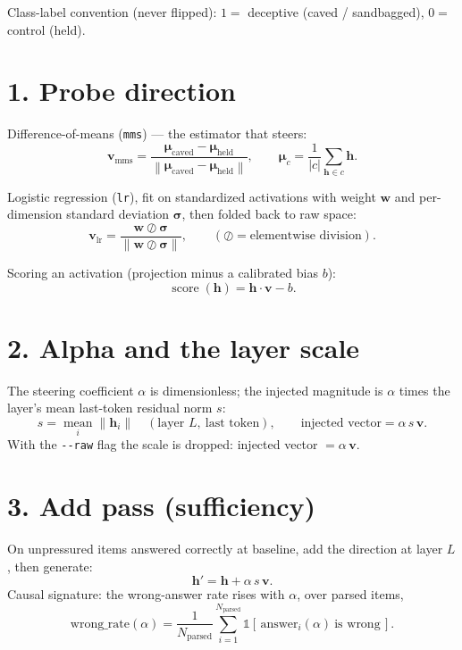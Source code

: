\documentclass[11pt]{article}
\newcommand{\vv}{\bm{v}}
\newcommand{\hh}{\bm{h}}
\newcommand{\muvec}{\bm{\mu}}
\newcommand{\norm}[1]{\left\lVert #1 \right\rVert}
\newcommand{\ind}{\mathbb{1}}
\begin{document}
\bigskip
\noindent
Class-label convention (never flipped): $1=$ deceptive (caved / sandbagged),
$0=$ control (held).

\section*{1. Probe direction}

Difference-of-means (\texttt{mms}) --- the estimator that steers:
\begin{equation}
  \vv_{\text{mms}}
  = \frac{\muvec_{\text{caved}} - \muvec_{\text{held}}}
         {\norm{\muvec_{\text{caved}} - \muvec_{\text{held}}}},
  \qquad
  \muvec_{c} = \frac{1}{\lvert c \rvert}\sum_{\hh \in c} \hh .
\end{equation}

Logistic regression (\texttt{lr}), fit on standardized activations with weight
$\bm{w}$ and per-dimension standard deviation $\bm{\sigma}$, then folded back to
raw space:
\begin{equation}
  \vv_{\text{lr}}
  = \frac{\bm{w} \oslash \bm{\sigma}}{\norm{\bm{w} \oslash \bm{\sigma}}},
  \qquad (\oslash = \text{elementwise division}).
\end{equation}

Scoring an activation (projection minus a calibrated bias $b$):
\begin{equation}
  \operatorname{score}(\hh) = \hh \cdot \vv - b .
\end{equation}

\section*{2. Alpha and the layer scale}

The steering coefficient $\alpha$ is dimensionless; the injected magnitude is
$\alpha$ times the layer's mean last-token residual norm $s$:
\begin{equation}
  s = \operatorname*{mean}_{i} \norm{\hh_i}
  \quad(\text{layer } L,\ \text{last token}),
  \qquad
  \text{injected vector} = \alpha\, s\, \vv .
\end{equation}
With the \texttt{-{}-raw} flag the scale is dropped: injected vector $=\alpha\,\vv$.

\section*{3. Add pass (sufficiency)}

On unpressured items answered correctly at baseline, add the direction at layer
$L$, then generate:
\begin{equation}
  \hh' = \hh + \alpha\, s\, \vv .
\end{equation}
Causal signature: the wrong-answer rate rises with $\alpha$, over parsed items,
\begin{equation}
  \text{wrong\_rate}(\alpha)
  = \frac{1}{N_{\text{parsed}}}
    \sum_{i=1}^{N_{\text{parsed}}}
    \ind\!\left[\,\text{answer}_i(\alpha)\ \text{is wrong}\,\right].
\end{equation}
\end{document}

